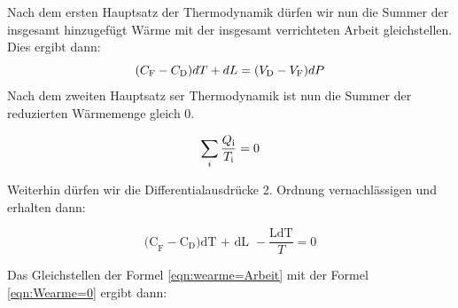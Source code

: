 Nach dem ersten Hauptsatz der Thermodynamik dürfen wir nun die Summer der insgesamt hinzugefügt Wärme mit der insgesamt 
verrichteten Arbeit gleichstellen. Dies ergibt dann:        
\begin{equation}
    (C_\text{F}-C_\text{D})dT + dL = (V_\text{D}-V_\text{F})dP\\
    \label{eqn:wearme=Arbeit}
\end{equation}
Nach dem zweiten Hauptsatz ser Thermodynamik ist nun die Summer der reduzierten Wärmemenge gleich 0.

\begin{equation}
    \sum_{i}\frac{Q_\text{i}}{T_\text{i}}=0\nonumber\\
    \label{eqn:sum1}
\end{equation}

Weiterhin dürfen wir die Differentialausdrücke 2. Ordnung vernachlässigen und erhalten dann:

\begin{equation}
    \text{(C}_\text{F} - \text{C}_\text{D}\text{)dT + dL }-\frac{\text{LdT}}{T}= 0
    \label{eqn:Wearme=0}
\end{equation}

Das Gleichstellen der Formel \eqref{eqn:wearme=Arbeit} mit der Formel \eqref{eqn:Wearme=0} ergibt dann:

